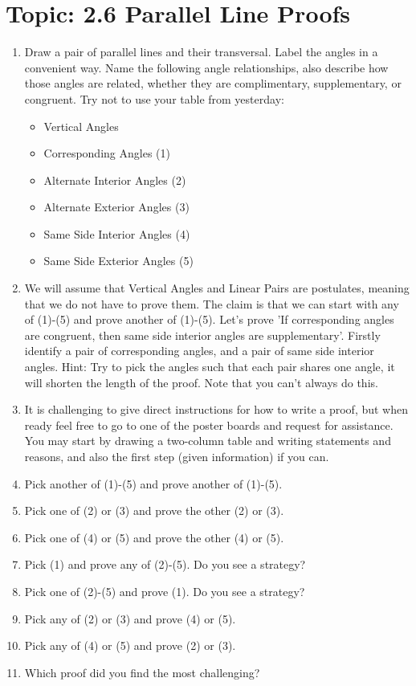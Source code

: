 \documentclass[12pt,letterpaper]{article}
\begin{document}
\section*{Topic: 2.6 Parallel Line Proofs}
\begin{enumerate}
    \item Draw a pair of parallel lines and their transversal. Label the angles in a convenient way. Name the following angle relationships, also describe how those angles are related, whether they are complimentary, supplementary, or congruent. Try not to use your table from yesterday:
          \begin{itemize}
              \item Vertical Angles
              \item Corresponding Angles (1)
              \item Alternate Interior Angles (2)
              \item Alternate Exterior Angles (3)
              \item Same Side Interior Angles (4)
              \item Same Side Exterior Angles (5)
          \end{itemize}
    \item We will assume that Vertical Angles and Linear Pairs are postulates, meaning that we do not have to prove them. The claim is that we can start with any of (1)-(5) and prove another of (1)-(5). Let's prove 'If corresponding angles are congruent, then same side interior angles are supplementary'. Firstly identify a pair of corresponding angles, and a pair of same side interior angles. Hint: Try to pick the angles such that each pair shares one angle, it will shorten the length of the proof. Note that you can't always do this.
    \item It is challenging to give direct instructions for how to write a proof, but when ready feel free to go to one of the poster boards and request for assistance. You may start by drawing a two-column table and writing statements and reasons, and also the first step (given information) if you can.
    \item Pick another of (1)-(5) and prove another of (1)-(5).
    \item Pick one of (2) or (3) and prove the other (2) or (3).
    \item Pick one of (4) or (5) and prove the other (4) or (5).
    \item Pick (1) and prove any of (2)-(5). Do you see a strategy?
    \item Pick one of (2)-(5) and prove (1). Do you see a strategy?
    \item Pick any of (2) or (3) and prove (4) or (5).
    \item Pick any of (4) or (5) and prove (2) or (3).
    \item Which proof did you find the most challenging?
\end{enumerate}
\end{document}
